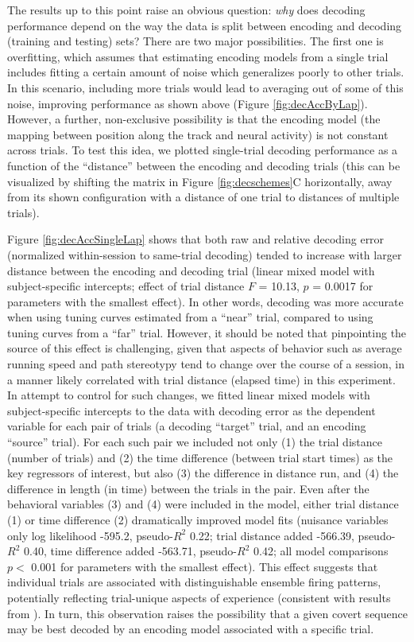\documentclass[11pt]{article}
\let\citeNP=\citealt
\begin{document}
The results up to this point raise an obvious question: {\it why} does
decoding performance depend on the way the data is split between
encoding and decoding (training and testing) sets? There are two major
possibilities. The first one is overfitting, which assumes that
estimating encoding models from a single trial includes fitting a
certain amount of noise which generalizes poorly to other trials. In
this scenario, including more trials would lead to averaging out of
some of this noise, improving performance as shown above (Figure
\ref{fig:decAccByLap}). However, a further, non-exclusive possibility
is that the encoding model (the mapping between position along the
track and neural activity) is not constant across trials. To test this
idea, we plotted single-trial decoding performance as a function of
the ``distance'' between the encoding and decoding trials (this can be
visualized by shifting the matrix in Figure \ref{fig:decschemes}C
horizontally, away from its shown configuration with a distance of
{\color{black} one trial to distances of multiple trials}).

Figure \ref{fig:decAccSingleLap} shows that both raw and relative
decoding error (normalized within-session to same-trial decoding) tended
to increase with larger distance between the encoding and decoding
trial (linear mixed model with subject-specific intercepts; effect of
trial distance $F$ = 10.13, $p$ = 0.0017 for parameters with the
smallest effect). {\color{black} In other words, decoding was more
  accurate when using tuning curves estimated from a ``near'' trial,
  compared to using tuning curves from a ``far'' trial.} However, it
should be noted that pinpointing the source of this effect is
challenging, given that aspects of behavior such as average running
speed and path stereotypy tend to change over the course of a session,
in a manner likely correlated with trial distance (elapsed time) in
this experiment. {\color{black} In attempt to control for such changes,
  we fitted linear mixed models with subject-specific intercepts to
  the data with decoding error as the dependent variable for each pair
  of trials (a decoding ``target'' trial, and an encoding ``source''
  trial). For each such pair we included not only (1) the trial
  distance (number of trials) and (2) the time difference (between
  trial start times) as the key regressors of interest, but also (3)
  the difference in distance run, and (4) the difference in length (in
  time) between the trials in the pair. Even after the behavioral
  variables (3) and (4) were included in the model, either trial
  distance (1) or time difference (2) dramatically improved model fits
  (nuisance variables only log likelihood -595.2, pseudo-$R^2$ 0.22;
  trial distance added -566.39, pseudo-$R^2$ 0.40, time difference
  added -563.71, pseudo-$R^2$ 0.42; all model comparisons $p <$
  0.001 for parameters with the smallest effect). This effect suggests
  that individual trials are associated with distinguishable ensemble
  firing patterns, potentially reflecting trial-unique aspects of
  experience (consistent with results from
  \citeNP{Manns2007,Mankin2012,Allen2012,Ziv2013a}). In turn, this observation
  raises the possibility that a given covert sequence may be best
  decoded by an encoding model associated with a specific trial.}
\end{document}
